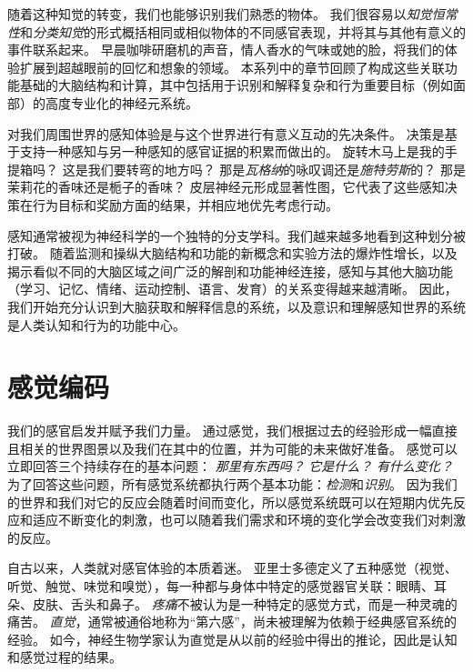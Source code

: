 随着这种知觉的转变，我们也能够识别我们熟悉的物体。
我们很容易以\textit{知觉恒常性}和\textit{分类知觉}的形式概括相同或相似物体的不同感官表现，并将其与其他有意义的事件联系起来。
早晨咖啡研磨机的声音，情人香水的气味或她的脸，将我们的体验扩展到超越眼前的回忆和想象的领域。
本系列中的章节回顾了构成这些关联功能基础的大脑结构和计算，其中包括用于识别和解释复杂和行为重要目标（例如面部）的高度专业化的神经元系统。


对我们周围世界的感知体验是与这个世界进行有意义互动的先决条件。
决策是基于支持一种感知与另一种感知的感官证据的积累而做出的。
旋转木马上是我的手提箱吗？
这是我们要转弯的地方吗？
那是\textit{瓦格纳}的咏叹调还是\textit{施特劳斯}的？
那是茉莉花的香味还是栀子的香味？
皮层神经元形成显著性图，它代表了这些感知决策在行为目标和奖励方面的结果，并相应地优先考虑行动。


感知通常被视为神经科学的一个独特的分支学科。我们越来越多地看到这种划分被打破。
随着监测和操纵大脑结构和功能的新概念和实验方法的爆炸性增长，以及揭示看似不同的大脑区域之间广泛的解剖和功能神经连接，感知与其他大脑功能（学习、记忆、情绪、运动控制、语言、发育）的关系变得越来越清晰。
因此，我们开始充分认识到大脑获取和解释信息的系统，以及意识和理解感知世界的系统是人类认知和行为的功能中心。



\chapter{感觉编码} \label{chap:chap17}


我们的感官启发并赋予我们力量。
通过感觉，我们根据过去的经验形成一幅直接且相关的世界图景以及我们在其中的位置，并为可能的未来做好准备。 
感觉可以立即回答三个持续存在的基本问题：
\textit{那里有东西吗？}
\textit{它是什么？}
\textit{有什么变化？}
为了回答这些问题，所有感觉系统都执行两个基本功能：\textit{检测}和\textit{识别}。
因为我们的世界和我们对它的反应会随着时间而变化，所以感觉系统既可以在短期内优先反应和适应不断变化的刺激，也可以随着我们需求和环境的变化学会改变我们对刺激的反应。


自古以来，人类就对感官体验的本质着迷。
亚里士多德定义了五种感觉（视觉、听觉、触觉、味觉和嗅觉），每一种都与身体中特定的感觉器官关联：眼睛、耳朵、皮肤、舌头和鼻子。
\textit{疼痛}不被认为是一种特定的感觉方式，而是一种灵魂的痛苦。
\textit{直觉}，通常被通俗地称为“第六感”，尚未被理解为依赖于经典感官系统的经验。
如今，神经生物学家认为直觉是从以前的经验中得出的推论，因此是认知和感觉过程的结果。


